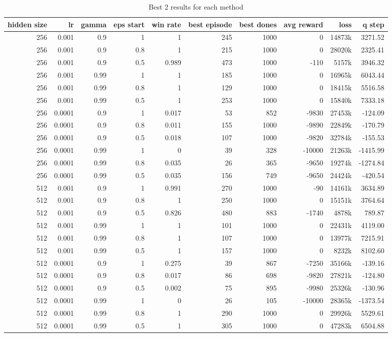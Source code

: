 \begin{table}
	\centering
	\scriptsize
	\begin{tabular}{r r r r | r r r r r r}
		\toprule
			hidden size & lr & gamma & eps start & win rate & best episode & best dones & avg reward & loss & q step \\
		\midrule
			256 & 0.001 & 0.9 & 1 & 1 & 245 & 1000 & 0 & 14873k & 3271.52 \\
			256 & 0.001 & 0.9 & 0.8 & 1 & 215 & 1000 & 0 & 28020k & 2325.41 \\
			256 & 0.001 & 0.9 & 0.5 & 0.989 & 473 & 1000 & -110 & 5157k & 3946.32 \\
			256 & 0.001 & 0.99 & 1 & 1 & 185 & 1000 & 0 & 16965k & 6043.44 \\
			256 & 0.001 & 0.99 & 0.8 & 1 & 129 & 1000 & 0 & 18415k & 5516.58 \\
			256 & 0.001 & 0.99 & 0.5 & 1 & 253 & 1000 & 0 & 15840k & 7333.18 \\
			256 & 0.0001 & 0.9 & 1 & 0.017 & 53 & 852 & -9830 & 27453k & -124.09 \\
			256 & 0.0001 & 0.9 & 0.8 & 0.011 & 155 & 1000 & -9890 & 22849k & -170.79 \\
			256 & 0.0001 & 0.9 & 0.5 & 0.018 & 107 & 1000 & -9820 & 32784k & -155.53 \\
			256 & 0.0001 & 0.99 & 1 & 0 & 39 & 328 & -10000 & 21263k & -1415.99 \\
			256 & 0.0001 & 0.99 & 0.8 & 0.035 & 26 & 365 & -9650 & 19274k & -1274.84 \\
			256 & 0.0001 & 0.99 & 0.5 & 0.035 & 156 & 749 & -9650 & 24424k & -420.54 \\
			512 & 0.001 & 0.9 & 1 & 0.991 & 270 & 1000 & -90 & 14161k & 3634.89 \\
			512 & 0.001 & 0.9 & 0.8 & 1 & 250 & 1000 & 0 & 15151k & 3764.64 \\
			512 & 0.001 & 0.9 & 0.5 & 0.826 & 480 & 883 & -1740 & 4878k & 789.87 \\
			512 & 0.001 & 0.99 & 1 & 1 & 101 & 1000 & 0 & 22431k & 4119.00 \\
			512 & 0.001 & 0.99 & 0.8 & 1 & 107 & 1000 & 0 & 13977k & 7215.91 \\
			512 & 0.001 & 0.99 & 0.5 & 1 & 157 & 1000 & 0 & 8232k & 8102.60 \\
			512 & 0.0001 & 0.9 & 1 & 0.275 & 39 & 867 & -7250 & 35166k & -139.16 \\
			512 & 0.0001 & 0.9 & 0.8 & 0.017 & 86 & 698 & -9820 & 27821k & -124.80 \\
			512 & 0.0001 & 0.9 & 0.5 & 0.002 & 75 & 895 & -9980 & 25326k & -130.96 \\
			512 & 0.0001 & 0.99 & 1 & 0 & 26 & 105 & -10000 & 28365k & -1373.54 \\
			512 & 0.0001 & 0.99 & 0.8 & 1 & 290 & 1000 & 0 & 29926k & 5529.61 \\
			512 & 0.0001 & 0.99 & 0.5 & 1 & 305 & 1000 & 0 & 47283k & 6504.88 \\
		\bottomrule
	\end{tabular}
	\caption{Best 2 results for each method}
	\label{ddqn_results}
\end{table}
